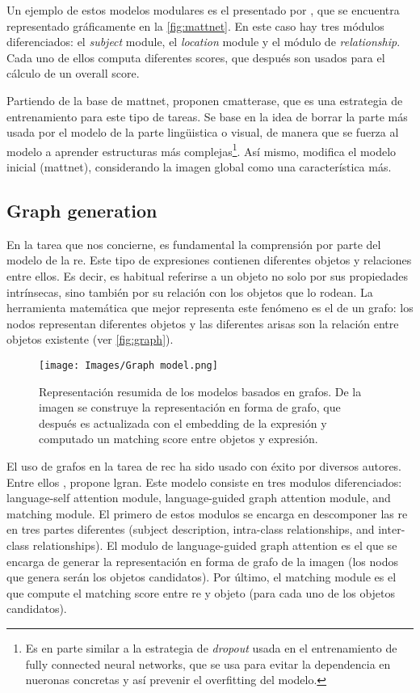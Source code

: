 Un ejemplo de estos modelos modulares es el presentado por ,
que se encuentra representado gráficamente en la \vref{fig:mattnet}. En este
caso hay tres módulos diferenciados: el \emph{subject} module, el
\emph{location} module y el módulo de \emph{relationship}. Cada uno de ellos
computa diferentes scores, que después son usados para el cálculo de un overall
score.

Partiendo de la base de \gls{mattnet},
 proponen
\gls{cmatterase}, que es una estrategia de entrenamiento para este tipo de
tareas. Se base en la idea de borrar la parte más usada por el modelo de la
parte lingüistica o visual, de manera que se fuerza al modelo a aprender
estructuras más complejas\footnote{Es en parte similar a la estrategia de
  \emph{dropout} usada en el entrenamiento de fully connected neural networks,
  que se usa para evitar la dependencia en nueronas concretas y así prevenir el
  overfitting del modelo.}. Así mismo, modifica el modelo inicial
(\gls{mattnet}), considerando la imagen global como una característica más.

\subsection{Graph generation} \label{sec:graph}
En la tarea que nos concierne, es fundamental la comprensión por parte del
modelo de la \gls{re}. Este tipo de expresiones contienen diferentes objetos y
relaciones entre ellos. Es decir, es habitual referirse a un objeto no solo por
sus propiedades intrínsecas, sino también por su relación con los objetos que
lo rodean. La herramienta matemática que mejor representa este fenómeno es el
de un grafo: los nodos representan diferentes objetos y las diferentes arisas
son la relación entre objetos existente (ver \vref{fig:graph}).

\begin{figure}[ht]
  \centering
  \texttt{[image: Images/Graph model.png]}
  \caption[Graph based model representation]{Representación resumida de los
    modelos basados en grafos. De la imagen se construye la representación en
    forma de grafo, que después es actualizada con el embedding de la expresión
    y computado un matching score entre objetos y expresión.}
  \label{fig:graph}
\end{figure}

El uso de grafos en la tarea de \gls{rec} ha sido usado con éxito por diversos
autores. Entre ellos , propone \gls{lgran}. Este modelo
consiste en tres modulos diferenciados: language-self attention module,
language-guided graph attention module, and matching module. El primero de
estos modulos se encarga en descomponer las \gls{re} en tres partes diferentes
(subject description, intra-class relationships, and inter-class
relationships). El modulo de language-guided graph attention es el que se
encarga de generar la representación en forma de grafo de la imagen (los nodos
que genera serán los objetos candidatos). Por último, el matching module es el
que compute el matching score entre \gls{re} y objeto (para cada uno de los
objetos candidatos).

